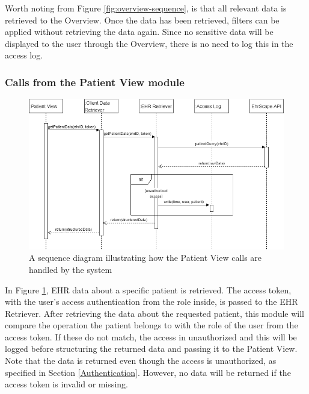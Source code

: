 \documentclass{article}
\begin{document}
Worth noting from Figure \ref{fig:overview-sequence}, is that all relevant data is retrieved to the Overview. Once the data has been retrieved, filters can be applied without retrieving the data again. Since no sensitive data will be displayed to the user through the Overview, there is no need to log this in the access log.

\subsubsection{Calls from the Patient View module}
\begin{figure}[h]
    \centering
    \includegraphics[scale = 0.45]{patient-sequence}
    \caption{A sequence diagram illustrating how the Patient View calls are handled by the system}
    \label{fig:patient-sequence}
\end{figure}

In Figure \ref{fig:patient-sequence}, EHR data about a specific patient is retrieved. The access token, with the user's access authentication from the role inside, is passed to the EHR Retriever. After retrieving the data about the requested patient, this module will compare the operation the patient belongs to with the role of the user from the access token. If these do not match, the access in unauthorized and this will be logged before structuring the returned data and passing it to the Patient View. Note that the data is returned even though the access is unauthorized, as specified in Section \ref{Authentication}. However, no data will be returned if the access token is invalid or missing.
\end{document}
